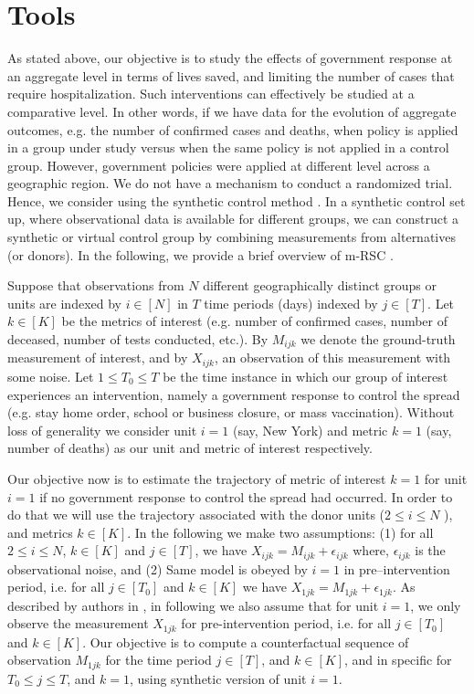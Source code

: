 \documentclass[preprint,authoryear,12pt]{elsarticle}
\begin{document}
	\section{Tools}
	\label{SEC2}
	As stated above, our objective is to study the effects of government response at an aggregate level in terms of lives saved, and limiting the number of cases that require hospitalization. Such interventions can effectively be studied at a comparative level. In other words, if we have data for the evolution of aggregate outcomes, e.g. the number of confirmed cases and deaths, when policy is applied in a group under study versus when the same policy is not applied in a control group. However, government policies were applied at different level across a geographic region.  We do not have a mechanism to conduct a randomized trial. Hence, we consider using the synthetic control method \cite{ap08746, JMLR18, AMSS19}. In a synthetic control set up, where observational data is available for different groups, we can construct a synthetic or virtual control group by combining measurements from alternatives (or donors). In the following, we provide a brief overview of m-RSC \cite{AMSS19}.\par
	
	Suppose that observations from $N$ different geographically distinct groups or units are indexed by $i \in [N]$ in $T$ time periods (days) indexed by $j \in [T]$. Let $k \in [K]$ be the metrics of interest (e.g. number of confirmed cases, number of deceased, number of tests conducted, etc.). By $M_{ijk}$ we denote the ground-truth measurement of interest, and by $X_{ijk}$, an observation of this measurement with some noise. Let $1 \leq T_0 \leq T$ be the time instance in which our group of interest experiences an intervention, namely a government response to control the spread (e.g. stay home order, school or business closure, or mass vaccination). Without loss of generality we consider unit $i = 1$ (say, New York) and metric $k = 1$ (say, number of deaths) as our unit and metric of interest respectively.\par
	
	Our objective now is to estimate the trajectory of metric of interest $k = 1$  for unit $i = 1$ if no government response to control the spread had occurred. In order to do that we will use the trajectory associated with the donor units ($2 \leq i \leq N$ ), and metrics $k \in [K ]$. In the following we make two assumptions: (1) for all $2 \leq i \leq N$, $k \in [K]$ and $j \in [T]$, we have  $X_{ijk} = M_{ijk} + \epsilon_{ijk}$ where, $\epsilon_{ijk}$ is the observational noise, and (2) Same model is obeyed by $i=1$ in pre--intervention period, i.e. for all $j \in [T_0]$ and $k \in [K]$ we have $X_{1jk} = M_{1jk} + \epsilon_{1jk}$. As described by authors in \cite{AMSS19}, in following we also assume that for unit $i=1$, we only observe the measurement $X_{1jk}$ for pre-intervention period, i.e. for all $j \in [T_0]$ and $k \in [K]$. Our objective is to compute a counterfactual sequence of observation $M_{1jk}$ for the time period $j \in [T]$, and $k \in [K]$, and in specific for $T_0 \leq j \leq T$, and $k = 1$, using synthetic version of unit $i=1$.\par
	
\end{document}
